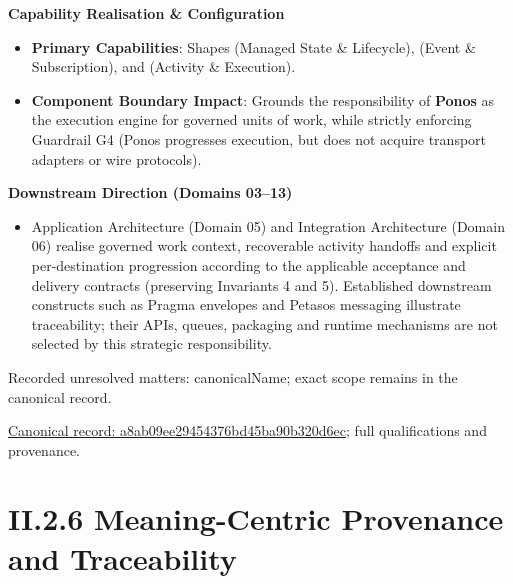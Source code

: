 \par\medskip\textbf{Capability Realisation \& Configuration}\par


\begin{itemize}


\item \textbf{Primary Capabilities}: Shapes \texttt{} (Managed State \& Lifecycle), \texttt{} (Event \& Subscription), and \texttt{} (Activity \& Execution).

\item \textbf{Component Boundary Impact}: Grounds the responsibility of \textbf{Ponos} as the execution engine for governed units of work, while strictly enforcing Guardrail G4 (Ponos progresses execution, but does not acquire transport adapters or wire protocols).

\end{itemize}


\par\medskip\textbf{Downstream Direction (Domains 03–13)}\par


\begin{itemize}


\item Application Architecture (Domain 05) and Integration Architecture (Domain 06) realise governed work context, recoverable activity handoffs and explicit per-destination progression according to the applicable acceptance and delivery contracts (preserving Invariants 4 and 5). Established downstream constructs such as Pragma envelopes and Petasos messaging illustrate traceability; their APIs, queues, packaging and runtime mechanisms are not selected by this strategic responsibility.

\end{itemize}

{\small Recorded unresolved matters: canonicalName; exact scope remains in the canonical record.}\par
{\footnotesize \href{../../../../../../../continuum/strategy/course-of-action/a8ab09ee29454376bd45ba90b320d6ec.md}{Canonical record: a8ab09ee29454376bd45ba90b320d6ec}; full qualifications and provenance.}\par
\section*{II.2.6 Meaning-Centric Provenance and Traceability}
\label{navigation:II.2.6}

